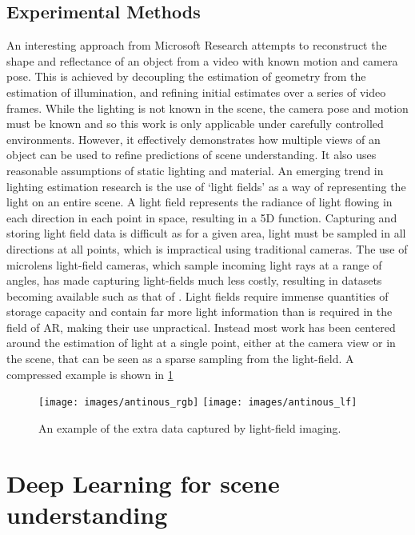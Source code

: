 \documentclass[ %
                    author={Gavin Parker},
                supervisor={Dr. Neill Campbell},
                    degree={MEng},
                     title={Deep Learning for Illumination Estimation from Stereo Images},
                  subtitle={},
                      type={Research},
                      year={2018} ]{dissertation}
\begin{document}
\subsection{Experimental Methods}
An interesting approach from Microsoft Research \cite{xia} attempts to reconstruct the shape and reflectance of an object from a video with known motion and camera pose. This is achieved by decoupling the estimation of geometry from the estimation of illumination, and refining initial estimates over a series of video frames. While the lighting is not known in the scene, the camera pose and motion must be known and so this work is only applicable under carefully controlled environments. However, it effectively demonstrates how multiple views of an object can be used to refine predictions of scene understanding. It also uses reasonable assumptions of static lighting and material.
\newline
An emerging trend in lighting estimation research is the use of `light fields' as a way of representing the light on an entire scene. A light field represents the radiance of light flowing in each direction in each point in space, resulting in a 5D function. Capturing and storing light field data is difficult as for a given area, light must be sampled in all directions at all points, which is impractical using traditional cameras. The use of microlens light-field cameras, which sample incoming light rays at a range of angles, has made capturing light-fields much less costly, resulting in datasets becoming available such as that of \cite{hazirbas17ddff}. Light fields require immense quantities of storage capacity and contain far more light information than is required in the field of AR, making their use unpractical. Instead most work has been centered around the estimation of light at a single point, either at the camera view or in the scene, that can be seen as a sparse sampling from the light-field. A compressed example is shown in \ref{fig:lf}
\begin{figure}[H]
\texttt{[image: images/antinous\_rgb]}
\texttt{[image: images/antinous\_lf]}
\centering
\caption{An example of the extra data captured by light-field imaging.}
\label{fig:lf}
\end{figure}
\section{Deep Learning for scene understanding}
\end{document}
